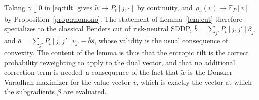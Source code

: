 \documentclass[pdflatex,sn-mathphys-num]{sn-jnl}
\theoremstyle{thmstyleone}
\theoremstyle{thmstyletwo}
\theoremstyle{thmstylethree}
\newcommand{\E}{\mathbb{E}}
\begin{document}
\begin{appendices}
Taking $\gamma\downarrow0$ in \eqref{eq:tilt} gives
$\tilde w\to P_t[j,\cdot]$ by continuity, and
$\rho_\gamma(v)\to\E_P[v]$ by Proposition~\ref{prop:rhomono}. The
statement of Lemma~\ref{lem:cut} therefore specializes to the classical
Benders cut of risk-neutral SDDP, $\bar b=\sum_{j'}P_t[j,j']\beta_{j'}$ and
$\bar a=\sum_{j'}P_t[j,j']v_{j'}-\bar b\hat s$, whose validity is the usual
consequence of convexity. The content of the lemma is thus that the
entropic tilt is the correct probability reweighting to apply to the dual
vector, and that no additional correction term is needed--a consequence
of the fact that $\tilde w$ is the Donsker--Varadhan maximizer for the
value vector $v$, which is exactly the vector at which the subgradients
$\beta$ are evaluated.

\end{appendices}


\end{document}
